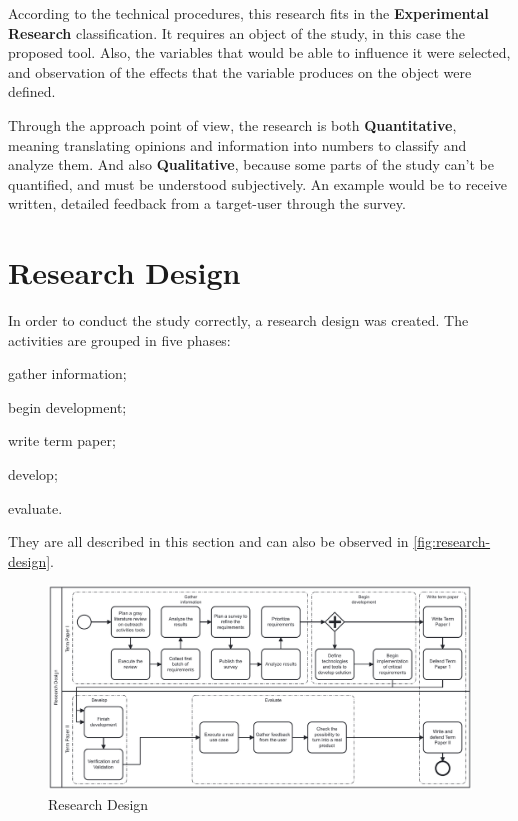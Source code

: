 According to the technical procedures, this research fits in the \textbf{Experimental Research} classification. It requires an object of the study, in this case the proposed tool. Also, the variables that would be able to influence it were selected, and observation of the effects that the variable produces on the object were defined.

Through the approach point of view, the research is both \textbf{Quantitative}, meaning translating opinions and information into numbers to classify and analyze them. And also \textbf{Qualitative}, because some parts of the study can't be quantified, and must be understood subjectively. An example would be to receive written, detailed feedback from a target-user through the survey.

\section{Research Design}\label{sec:met-3}

In order to conduct the study correctly, a research design was created. The activities are grouped in five phases:
\begin{inparaenum}[(1)]
  \item gather information;
  \item begin development;
  \item write term paper;
  \item develop;
  \item evaluate.
\end{inparaenum}
They are all described in this section and can also be observed in \autoref{fig:research-design}.

\begin{figure}[htb]
  \caption{Research Design}\label{fig:research-design}
  \begin{center}
    \includegraphics[width=16cm]{img/research design.pdf}
  \end{center}
\end{figure}

